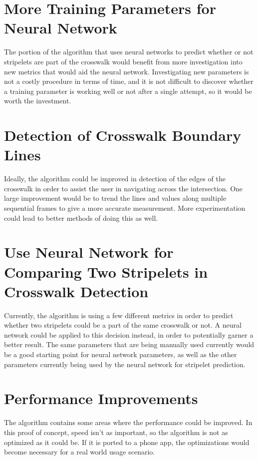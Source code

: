 \documentclass[12pt]{ucthesis}
\begin{document}
\section{More Training Parameters for Neural Network}

The portion of the algorithm that uses neural networks to predict whether or not stripelets are part of the crosswalk would benefit from more investigation into new metrics that would aid the neural network. Investigating new parameters is not a costly procedure in terms of time, and it is not difficult to discover whether a training parameter is working well or not after a single attempt, so it would be worth the investment.  

\section{Detection of Crosswalk Boundary Lines}

Ideally, the algorithm could be improved in detection of the edges of the crosswalk in order to assist the user in navigating across the intersection. One large improvement would be to trend the lines and values along multiple sequential frames to give a more accurate measurement. More experimentation could lead to better methods of doing this as well. 

\section{Use Neural Network for Comparing Two Stripelets in Crosswalk Detection}

Currently, the algorithm is using a few different metrics in order to predict whether two stripelets could be a part of the same crosswalk or not. A neural network could be applied to this decision instead, in order to potentially garner a better result. The same parameters that are being manually used currently would be a good starting point for neural network parameters, as well as the other parameters currently being used by the neural network for stripelet prediction. 

\section{Performance Improvements}

The algorithm contains some areas where the performance could be improved. In this proof of concept, speed isn't as important, so the algorithm is not as optimized as it could be. If it is ported to a phone app, the optimizations would become necessary for a real world usage scenario.
\end{document}
